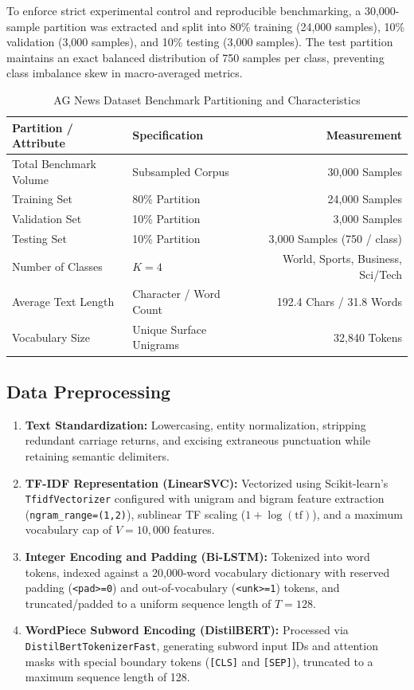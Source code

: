 \documentclass[12pt,a4paper]{report}
\begin{document}
To enforce strict experimental control and reproducible benchmarking, a 30,000-sample partition was extracted and split into 80\% training (24,000 samples), 10\% validation (3,000 samples), and 10\% testing (3,000 samples). The test partition maintains an exact balanced distribution of 750 samples per class, preventing class imbalance skew in macro-averaged metrics.

\begin{table}[H]
\centering
\caption{AG News Dataset Benchmark Partitioning and Characteristics}
\label{tab:exp9_dataset}
\begin{tabular}{llr}
\toprule
\textbf{Partition / Attribute} & \textbf{Specification} & \textbf{Measurement} \\
\midrule
Total Benchmark Volume & Subsampled Corpus & 30,000 Samples \\
Training Set & 80\% Partition & 24,000 Samples \\
Validation Set & 10\% Partition & 3,000 Samples \\
Testing Set & 10\% Partition & 3,000 Samples (750 / class) \\
Number of Classes & $K=4$ & World, Sports, Business, Sci/Tech \\
Average Text Length & Character / Word Count & 192.4 Chars / 31.8 Words \\
Vocabulary Size & Unique Surface Unigrams & 32,840 Tokens \\
\bottomrule
\end{tabular}
\end{table}

\subsection{Data Preprocessing}
\begin{enumerate}
    \item \textbf{Text Standardization:} Lowercasing, entity normalization, stripping redundant carriage returns, and excising extraneous punctuation while retaining semantic delimiters.
    \item \textbf{TF-IDF Representation (LinearSVC):} Vectorized using Scikit-learn's \lstinline|TfidfVectorizer| configured with unigram and bigram feature extraction (\lstinline|ngram_range=(1,2)|), sublinear TF scaling ($1 + \log(\text{tf})$), and a maximum vocabulary cap of $V = 10,000$ features.
    \item \textbf{Integer Encoding and Padding (Bi-LSTM):} Tokenized into word tokens, indexed against a 20,000-word vocabulary dictionary with reserved padding (\lstinline|<pad>=0|) and out-of-vocabulary (\lstinline|<unk>=1|) tokens, and truncated/padded to a uniform sequence length of $T = 128$.
    \item \textbf{WordPiece Subword Encoding (DistilBERT):} Processed via \lstinline|DistilBertTokenizerFast|, generating subword input IDs and attention masks with special boundary tokens (\lstinline|[CLS]| and \lstinline|[SEP]|), truncated to a maximum sequence length of 128.
\end{enumerate}
\end{document}
